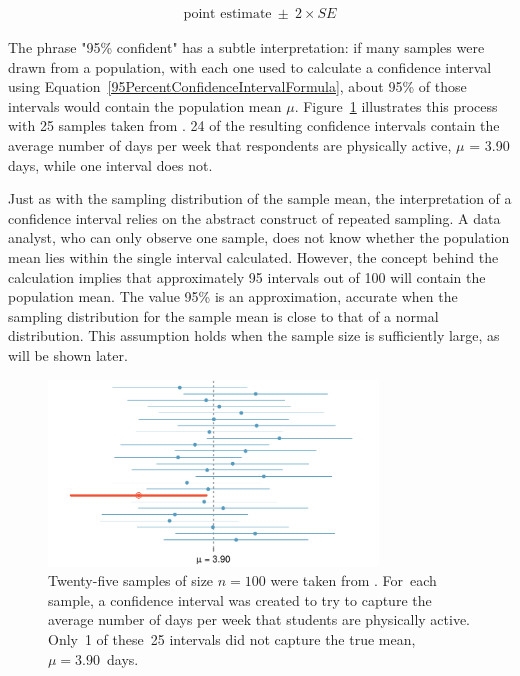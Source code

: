 \begin{spacing}{1.5}
\begin{align}
\text{point estimate}\ \pm\ 2\times SE
\label{95PercentConfidenceIntervalFormula}
\end{align}

The phrase "95\% confident" has a subtle interpretation: if many samples were drawn from a population, with each one used to calculate a confidence interval using Equation~\ref{95PercentConfidenceIntervalFormula}, about 95\% of those intervals would contain the population mean $\mu$. Figure~\ref{95PercentConfidenceInterval} illustrates this process with 25 samples taken from . 24 of the resulting confidence intervals contain the average number of days per week that respondents are physically active, $\mu$ = 3.90 days, while one interval does not. 

Just as with the sampling distribution of the sample mean, the interpretation of a confidence interval relies on the abstract construct of repeated sampling. A data analyst, who can only observe one sample, does not know whether the population mean lies within the single interval calculated. However, the concept behind the calculation implies that approximately 95 intervals out of 100 will contain the population mean. The value 95\% is an approximation, accurate when the sampling distribution for the sample mean is close to that of a normal distribution. This assumption holds when the sample size is sufficiently large, as will be shown later.

\begin{figure}[hht]
   \centering
   \includegraphics[width=0.78\textwidth]
{ch_inference_foundations_oi_biostat/figures/95PercentConfidenceInterval/95PercentConfidenceInterval}
   \caption{Twenty-five samples of size $n=100$ were taken from . For~each sample, a confidence interval was created to try to capture the average number of days per week that students are physically active. Only~1 of these~25 intervals did not capture the true mean, $\mu = 3.90$~days.}
   \label{95PercentConfidenceInterval}
\end{figure}


\end{spacing}
